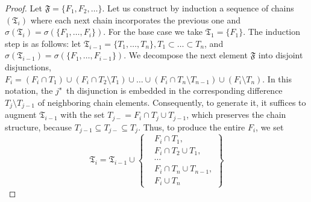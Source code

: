 \begin{proof}
	Let $\mathfrak{F} = \{F_1, F_2, \ldots\}$. Let us construct by induction a sequence of chains $(\mathfrak{T}_i)$ where each next chain incorporates the previous one and $\sigma(\mathfrak{T}_i) = \sigma(\{F_1, \ldots, F_i\})$. For the base case we take $\mathfrak{T}_1 = \{F_1\}$. The induction step is as follows: let $\mathfrak{T}_{i-1} = \{T_1, \ldots, T_n\}, T_1 \subset \ldots \subset T_n$, and $\sigma(\mathfrak{T}_{i-1}) = \sigma(\{F_1, \ldots, F_{i-1}\})$. We decompose the next element $\mathfrak{F}$ into disjoint disjunctions, $F_i = (F_i \cap T_1) \cup (F_i \cap T_2 \setminus T_1) \cup \ldots \cup (F_i \cap T_n \setminus T_{n-1}) \cup (F_i \setminus T_n)$. In this notation, the $j$"~th disjunction is embedded in the corresponding difference $T_j \setminus T_{j-1}$ of neighboring chain elements. Consequently, to generate it, it suffices to augment $\mathfrak{T}_{i-1}$ with the set $T_{j-} = F_i \cap T_j \cup T_{j-1}$, which preserves the chain structure, because $T_{j-1} \subseteq T_{j-} \subseteq T_j$. Thus, to produce the entire $F_i$, we set %
	\begin{equation*}
		\mathfrak{T}_i = \mathfrak{T}_{i-1} \cup \left\{
		\begin{aligned}
			&F_i \cap T_1,\\
			&F_i \cap T_2 \cup T_1,\\
			&\cdots\\
			&F_i \cap T_n \cup T_{n-1},\\
			&F_i \cup T_n
		\end{aligned}
		\right\}
	\end{equation*}
	

\end{proof}
